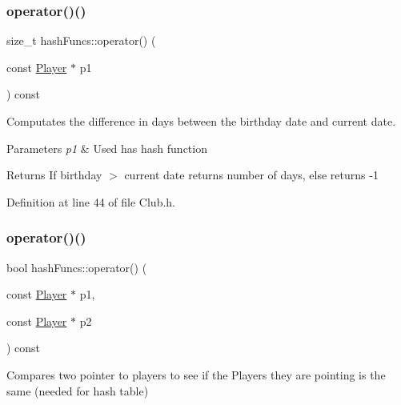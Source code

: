 \subsubsection{\texorpdfstring{operator()()}{operator()()}\hspace{0.1cm}{\footnotesize\ttfamily [1/2]}}
{\footnotesize\ttfamily size\+\_\+t hash\+Funcs\+::operator() (\begin{DoxyParamCaption}\item[{const \hyperlink{class_player}{Player} $\ast$}]{p1 }\end{DoxyParamCaption}) const\hspace{0.3cm}{\ttfamily [inline]}}



Computates the difference in days between the birthday date and current date. 


\begin{DoxyParams}{Parameters}
{\em p1} & Used has hash function \\
\hline
\end{DoxyParams}
\begin{DoxyReturn}{Returns}
If birthday $>$ current date returns number of days, else returns -\/1 
\end{DoxyReturn}


Definition at line 44 of file Club.\+h.

\hypertarget{structhash_funcs_a9e171ebf004435ea1d1ceb8a30f6a954}{}\label{structhash_funcs_a9e171ebf004435ea1d1ceb8a30f6a954} 
\subsubsection{\texorpdfstring{operator()()}{operator()()}\hspace{0.1cm}{\footnotesize\ttfamily [2/2]}}
{\footnotesize\ttfamily bool hash\+Funcs\+::operator() (\begin{DoxyParamCaption}\item[{const \hyperlink{class_player}{Player} $\ast$}]{p1,  }\item[{const \hyperlink{class_player}{Player} $\ast$}]{p2 }\end{DoxyParamCaption}) const\hspace{0.3cm}{\ttfamily [inline]}}



Compares two pointer to players to see if the Players they are pointing is the same (needed for hash table) 


